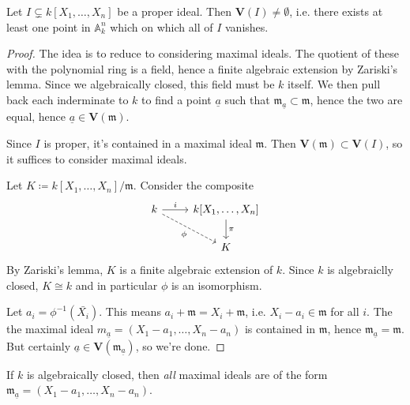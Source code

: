 \documentclass[12pt]{article}
\begin{document}
\begin{theorem}
	Let $I\subsetneq k[X_1,\dots,X_n]$ be a proper ideal. Then $\mathbf{V}(I)\neq\emptyset$, i.e. there exists at least one point in $\mathbb{A}^n_k$ which on which all of $I$ vanishes.
\end{theorem}
\begin{proof}
	The idea is to reduce to considering maximal ideals. The quotient of these with the polynomial ring is a field, hence a finite algebraic extension by Zariski's lemma. Since we algebraically closed, this field must be $k$ itself. We then pull back each inderminate to $k$ to find a point $\underline{a}$ such that $\mathfrak{m}_{\underline{a}}\subset\mathfrak{m}$, hence the two are equal, hence $\underline{a}\in\mathbf{V}(\mathfrak{m})$.

	Since $I$ is proper, it's contained in a maximal ideal $\mathfrak{m}$. Then $\mathbf{V}(\mathfrak{m})\subset\mathbf{V}(I)$, so it suffices to consider maximal ideals.

	Let $K\coloneqq k[X_1,\dots,X_n]/\mathfrak{m}$. Consider the composite 
	\begin{equation*}
\begin{tikzcd}
k \arrow[rd, "\phi"', dashed] \arrow[r, "i"] & {k[X_1,\dots,X_n]} \arrow[d, "\pi"] \\
                                             & K                                  
\end{tikzcd}
	\end{equation*}
	By Zariski's lemma, $K$ is a finite algebraic extension of $k$. Since $k$ is algebraiclly closed, $K\cong k$ and in particular $\phi$ is an isomorphism. 

	Let $a_i=\phi^{-1}(\bar{X_i})$. This means $a_i + \mathfrak{m} = X_i + \mathfrak{m}$, i.e. $X_i - a_i\in\mathfrak{m}$ for all $i$. The the maximal ideal $m_{\underline{a}}=(X_1-a_1,\dots,X_n-a_n)$ is contained in $\mathfrak{m}$, hence $\mathfrak{m}_{\underline{a}}=\mathfrak{m}$. But certainly $\underline{a}\in\mathbf{V}(\mathfrak{m}_{\underline{a}})$, so we're done. 
\end{proof}

\begin{corollary}
	If $k$ is algebraically closed, then \textit{all} maximal ideals are of the form $\mathfrak{m}_{\underline{a}}=(X_1-a_1,\dots,X_n-a_n)$.
\end{corollary}
\end{document}
